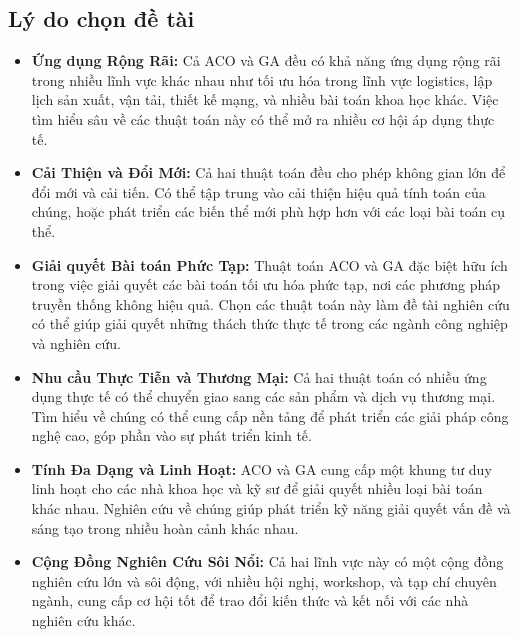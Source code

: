 \documentclass[14pt]{article}
\begin{document}
	\subsection{Lý do chọn đề tài}
	\begin{itemize}
		\item \textbf{Ứng dụng Rộng Rãi:} Cả ACO và GA đều có khả năng ứng dụng rộng rãi trong nhiều lĩnh vực khác nhau như tối ưu hóa trong lĩnh vực logistics, lập lịch sản xuất, vận tải, thiết kế mạng, và nhiều bài toán khoa học khác. Việc tìm hiểu sâu về các thuật toán này có thể mở ra nhiều cơ hội áp dụng thực tế.
		\item \textbf{Cải Thiện và Đổi Mới:} Cả hai thuật toán đều cho phép không gian lớn để đổi mới và cải tiến. Có thể tập trung vào cải thiện hiệu quả tính toán của chúng, hoặc phát triển các biến thể mới phù hợp hơn với các loại bài toán cụ thể.
		\item \textbf{Giải quyết Bài toán Phức Tạp:} Thuật toán ACO và GA đặc biệt hữu ích trong việc giải quyết các bài toán tối ưu hóa phức tạp, nơi các phương pháp truyền thống không hiệu quả. Chọn các thuật toán này làm đề tài nghiên cứu có thể giúp giải quyết những thách thức thực tế trong các ngành công nghiệp và nghiên cứu.
		\item \textbf{Nhu cầu Thực Tiễn và Thương Mại:} Cả hai thuật toán có nhiều ứng dụng thực tế có thể chuyển giao sang các sản phẩm và dịch vụ thương mại. Tìm hiểu về chúng có thể cung cấp nền tảng để phát triển các giải pháp công nghệ cao, góp phần vào sự phát triển kinh tế.
		\item \textbf{Tính Đa Dạng và Linh Hoạt:} ACO và GA cung cấp một khung tư duy linh hoạt cho các nhà khoa học và kỹ sư để giải quyết nhiều loại bài toán khác nhau. Nghiên cứu về chúng giúp phát triển kỹ năng giải quyết vấn đề và sáng tạo trong nhiều hoàn cảnh khác nhau.
		\item \textbf{Cộng Đồng Nghiên Cứu Sôi Nổi:} Cả hai lĩnh vực này có một cộng đồng nghiên cứu lớn và sôi động, với nhiều hội nghị, workshop, và tạp chí chuyên ngành, cung cấp cơ hội tốt để trao đổi kiến thức và kết nối với các nhà nghiên cứu khác.
	\end{itemize}
\end{document}
